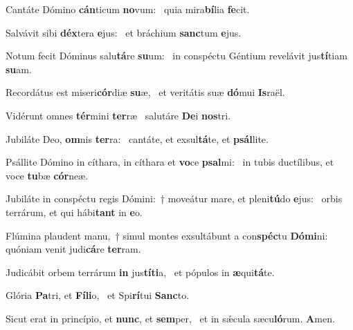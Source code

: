 \item Cantáte Dómino \textbf{cán}ticum \textbf{no}vum:~\psstar{} quia mira\textbf{bí}lia \textbf{fe}cit.
\item Salvávit sibi \textbf{déx}tera \textbf{e}jus:~\psstar{} et bráchium \textbf{sanc}tum \textbf{e}jus.
\item Notum fecit Dóminus salu\textbf{tá}re \textbf{su}um:~\psstar{} in conspéctu Géntium revelávit jus\textbf{tí}tiam \textbf{su}am.
\item Recordátus est miseri\textbf{cór}diæ \textbf{su}æ,~\psstar{} et veritátis suæ \textbf{dó}mui \textbf{Is}raël.
\item Vidérunt omnes \textbf{tér}mini \textbf{ter}ræ~\psstar{} salutáre \textbf{De}i \textbf{nos}tri.
\item Jubiláte Deo, \textbf{om}nis \textbf{ter}ra:~\psstar{} cantáte, et exsul\textbf{tá}te, et \textbf{psál}lite.
\item Psállite Dómino in cíthara, in cíthara et \textbf{vo}ce \textbf{psal}mi:~\psstar{} in tubis ductílibus, et voce \textbf{tu}bæ \textbf{cór}neæ.
\item Jubiláte in conspéctu regis Dómini:~† moveátur mare, et pleni\textbf{tú}do \textbf{e}jus:~\psstar{} orbis terrárum, et qui hábi\textbf{tant} in \textbf{e}o.
\item Flúmina plaudent manu,~† simul montes exsultábunt a con\textbf{spéc}tu \textbf{Dó}\textbf{mi}ni:~\psstar{} quóniam venit judi\textbf{cá}re \textbf{ter}ram.
\item Judicábit orbem terrárum \textbf{in} jus\textbf{tí}\textbf{ti}a,~\psstar{} et pópulos in \textbf{æ}qui\textbf{tá}te.
\item Glória \textbf{Pa}tri, et \textbf{Fí}\textbf{li}o,~\psstar{} et Spi\textbf{rí}tui \textbf{Sanc}to.
\item Sicut erat in princípio, et \textbf{nunc}, et \textbf{sem}per,~\psstar{} et in sǽcula sæcu\textbf{ló}rum. \textbf{A}men.